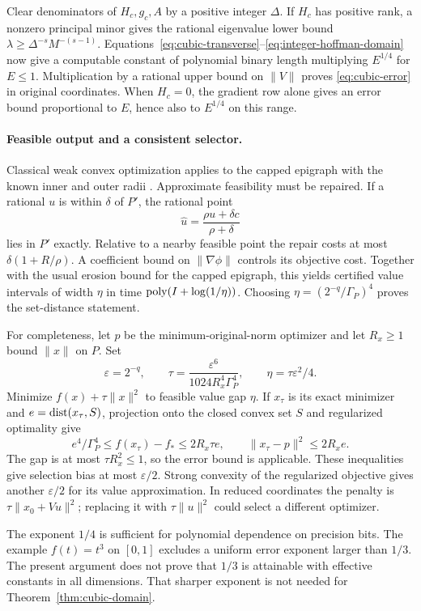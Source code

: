 Clear denominators of $H_c,g_c,A$ by a positive integer $\Delta$.
If $H_c$ has positive rank, a nonzero principal minor gives the
rational eigenvalue lower bound
$\lambda\ge\Delta^{-s}M^{-(s-1)}$.
Equations~\eqref{eq:cubic-transverse}--\eqref{eq:integer-hoffman-domain}
now give a computable constant of polynomial binary length multiplying
$E^{1/4}$ for $E\le1$. Multiplication by a rational upper bound on
$\|V\|$ proves \eqref{eq:cubic-error} in original coordinates.
When $H_c=0$, the gradient row alone gives an error bound proportional
to $E$, hence also to $E^{1/4}$ on this range.

\paragraph{Feasible output and a consistent selector.}
Classical weak convex optimization applies to the capped epigraph with
the known inner and outer radii \citep{GroetschelLovaszSchrijver1988}. Approximate
feasibility must be repaired. If a rational $u$ is within $\delta$
of $P'$, the rational point
\[
 \widehat u=\frac{\rho u+\delta c}{\rho+\delta}
\]
lies in $P'$ exactly. Relative to a nearby feasible point the repair
costs at most $\delta(1+R/\rho)$. A coefficient bound on
$\|\nabla\phi\|$ controls its objective cost. Together with the
usual erosion bound for the capped epigraph, this yields certified
value intervals of width $\eta$ in time
$\operatorname{poly}(I+\log(1/\eta))$. Choosing
$\eta=(2^{-q}/\Gamma_P)^4$ proves the set-distance statement.

For completeness, let $p$ be the minimum-original-norm optimizer and
let $R_x\ge1$ bound $\|x\|$ on $P$. Set
\[
 \varepsilon=2^{-q},\qquad
 \tau=\frac{\varepsilon^6}{1024R_x^4\Gamma_P^4},\qquad
 \eta=\tau\varepsilon^2/4.
\]
Minimize $f(x)+\tau\|x\|^2$ to feasible value gap $\eta$.
If $x_\tau$ is its exact minimizer and
$e=\operatorname{dist}(x_\tau,S)$, projection onto the closed convex set $S$
and regularized optimality give
\[
 e^4/\Gamma_P^4\le f(x_\tau)-f_*
 \le2R_x\tau e,\qquad
 \|x_\tau-p\|^2\le2R_xe.
\]
The gap is at most $\tau R_x^2\le1$, so the error bound is
applicable. These inequalities give selection bias at most
$\varepsilon/2$. Strong convexity of the regularized objective gives
another $\varepsilon/2$ for its value approximation. In reduced
coordinates the penalty is $\tau\|x_0+Vu\|^2$; replacing it with
$\tau\|u\|^2$ could select a different optimizer.

The exponent $1/4$ is sufficient for polynomial dependence on
precision bits. The example $f(t)=t^3$ on $[0,1]$ excludes a uniform
error exponent larger than $1/3$. The present argument does not prove
that $1/3$ is attainable with effective constants in all dimensions.
That sharper exponent is not needed for Theorem~\ref{thm:cubic-domain}.

